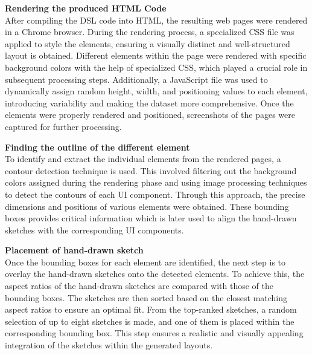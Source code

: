 \textbf{Rendering the produced HTML Code}\\
After compiling the DSL code into HTML, the resulting web pages were rendered in a Chrome browser. During the rendering process, a specialized CSS file was applied to style the elements, ensuring a visually distinct and well-structured layout is obtained. Different elements within the page were rendered with specific background colors with the help of specialized CSS, which played a crucial role in subsequent processing steps. Additionally, a JavaScript file was used to dynamically assign random height, width, and positioning values to each element, introducing variability and making the dataset more comprehensive. Once the elements were properly rendered and positioned, screenshots of the pages were captured for further processing.

\textbf{Finding the outline of the different element}\\
To identify and extract the individual elements from the rendered pages, a contour detection technique is used. This involved filtering out the background colors assigned during the rendering phase and using image processing techniques to detect the contours of each UI component. Through this approach, the precise dimensions and positions of various elements were obtained. These bounding boxes provides critical information which is later used to align the hand-drawn sketches with the corresponding UI components.

\textbf{Placement of hand-drawn sketch}\\
Once the bounding boxes for each element are identified, the next step is to overlay the hand-drawn sketches onto the detected elements. To achieve this, the aspect ratios of the hand-drawn sketches are compared with those of the bounding boxes. The sketches are then sorted based on the closest matching aspect ratios to ensure an optimal fit. From the top-ranked sketches, a random selection of up to eight sketches is made, and one of them is placed within the corresponding bounding box. This step ensures a realistic and visually appealing integration of the sketches within the generated layouts.


